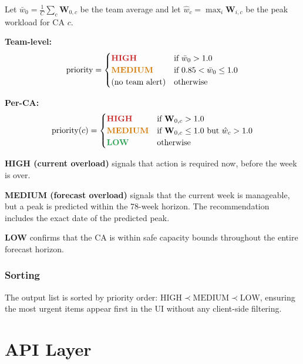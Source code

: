 \documentclass[12pt,a4paper]{report}
\begin{document}
\begin{tcolorbox}[defbox, title={Priority Rules}]
Let $\bar{w}_0 = \frac{1}{C}\sum_c \mathbf{W}_{0,c}$ be the team average
and let $\hat{w}_c = \max_i \mathbf{W}_{i,c}$ be the peak workload
for CA $c$.

\medskip
\textbf{Team-level:}
\[
  \text{priority} = \begin{cases}
    \textcolor{highred}{\textbf{HIGH}}   & \text{if } \bar{w}_0 > 1.0 \\
    \textcolor{medorange}{\textbf{MEDIUM}} & \text{if } 0.85 < \bar{w}_0 \leq 1.0 \\
    \text{(no team alert)} & \text{otherwise}
  \end{cases}
\]

\medskip
\textbf{Per-CA:}
\[
  \text{priority}(c) = \begin{cases}
    \textcolor{highred}{\textbf{HIGH}}     & \text{if } \mathbf{W}_{0,c} > 1.0 \\
    \textcolor{medorange}{\textbf{MEDIUM}} & \text{if } \mathbf{W}_{0,c} \leq 1.0
                                             \text{ but } \hat{w}_c > 1.0 \\
    \textcolor{lowgreen}{\textbf{LOW}}     & \text{otherwise}
  \end{cases}
\]
\end{tcolorbox}

\textbf{HIGH (current overload)} signals that action is required now,
before the week is over.

\textbf{MEDIUM (forecast overload)} signals that the current week
is manageable, but a peak is predicted within the 78-week horizon.
The recommendation includes the exact date of the predicted peak.

\textbf{LOW} confirms that the CA is within safe capacity bounds
throughout the entire forecast horizon.

\subsection{Sorting}

The output list is sorted by priority order:
$\text{HIGH} \prec \text{MEDIUM} \prec \text{LOW}$,
ensuring the most urgent items appear first in the UI without any
client-side filtering.

\chapter{API Layer}
\end{document}
